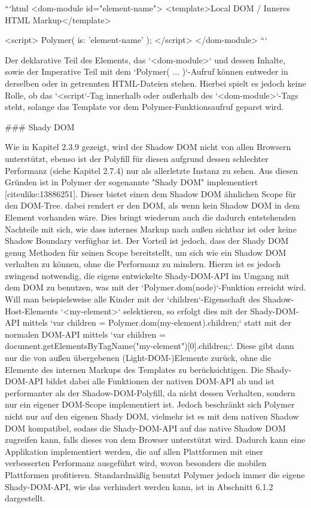 ```html
<dom-module id="element-name">
  <template>Local DOM / Inneres HTML Markup</template>

  <script>
    Polymer({
      is: 'element-name'
    });
  </script>
</dom-module>
```

Der deklarative Teil des Elements, das `<dom-module>` und dessen Inhalte, sowie der Imperative Teil mit dem `Polymer({ ... })`-Aufruf können entweder in derselben oder in getrennten HTML-Dateien stehen. Hierbei spielt es jedoch keine Rolle, ob das `<script`-Tag innerhalb oder außerhalb des `<dom-module>`-Tags steht, solange das Template vor dem Polymer-Funktionsaufruf geparst wird.


### Shady DOM

Wie in Kapitel 2.3.9 gezeigt, wird der Shadow DOM nicht von allen Browsern unterstützt, ebenso ist der Polyfill für diesen aufgrund dessen schlechter Performanz (siehe Kapitel 2.7.4) nur als allerletzte Instanz zu sehen. Aus diesen Gründen ist in Polymer der sogenannte "Shady DOM" implementiert [citeulike:13886251]. Dieser bietet einen dem Shadow DOM ähnlichen Scope für den DOM-Tree. dabei rendert er den DOM, als wenn kein Shadow DOM in dem Element vorhanden wäre. Dies bringt wiederum auch die dadurch entstehenden Nachteile mit sich, wie dass internes Markup nach außen sichtbar ist oder keine Shadow Boundary verfügbar ist. Der Vorteil ist jedoch, dass der Shady DOM genug Methoden für seinen Scope bereitstellt, um sich wie ein Shadow DOM verhalten zu können, ohne die Performanz zu mindern. Hierzu ist es jedoch zwingend notwendig, die eigens entwickelte Shady-DOM-API im Umgang mit dem DOM zu benutzen, was mit der `Polymer.dom(node)`-Funktion erreicht wird. Will man beispielsweise alle Kinder mit der `children`-Eigenschaft des Shadow-Host-Elements `<my-element>` selektieren, so erfolgt dies mit der Shady-DOM-API mittels `var children = Polymer.dom(my-element).children;` statt mit der normalen DOM-API mittels `var children =  document.getElementsByTagName("my-element")[0].children;`. Diese gibt dann nur die von außen übergebenen (Light-DOM-)Elemente zurück, ohne die Elemente des internen Markups des Templates zu berücksichtigen. Die Shady-DOM-API bildet dabei alle Funktionen der nativen DOM-API ab und ist performanter als der Shadow-DOM-Polyfill, da nicht dessen Verhalten, sondern nur ein eigener DOM-Scope implementiert ist. Jedoch beschränkt sich Polymer nicht nur auf den eigenen Shady DOM, vielmehr ist es mit dem nativen Shadow DOM kompatibel, sodass die Shady-DOM-API auf das native Shadow DOM zugreifen kann, falls dieses von dem Browser unterstützt wird. Dadurch kann eine Applikation implementiert werden, die auf allen Plattformen mit einer verbesserten Performanz ausgeführt wird, wovon besonders die mobilen Plattformen profitieren. Standardmäßig benutzt Polymer jedoch immer die eigene Shady-DOM-API, wie das verhindert werden kann, ist in Abschnitt 6.1.2 dargestellt.


